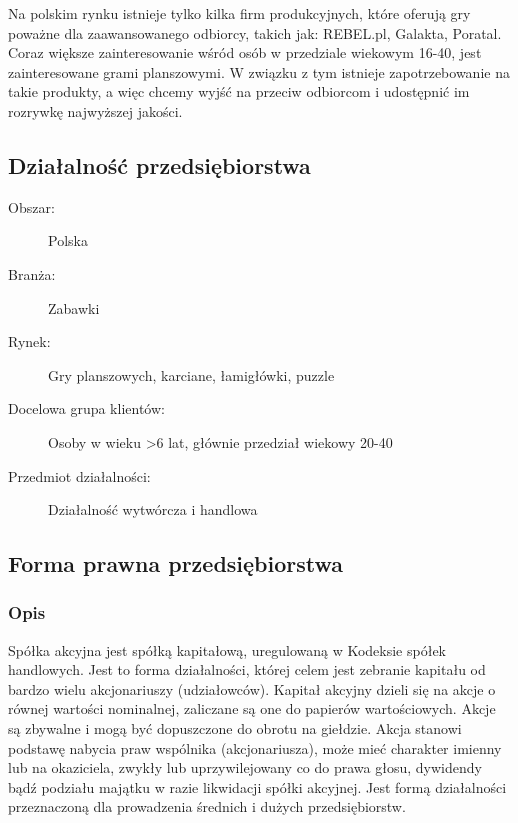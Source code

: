 \documentclass[a4paper, 11pt]{article}
\begin{document}
	Na polskim rynku istnieje tylko kilka firm produkcyjnych, które oferują gry poważne dla zaawansowanego odbiorcy, takich jak: REBEL.pl, Galakta, Poratal. Coraz większe zainteresowanie wśród osób w przedziale wiekowym 16-40, jest zainteresowane grami planszowymi. W związku z tym istnieje zapotrzebowanie na takie produkty, a więc chcemy wyjść na przeciw odbiorcom i udostępnić im rozrywkę najwyższej jakości.


	
	\subsection{Działalność przedsiębiorstwa}
	
	\begin{description}
	\item[Obszar:]	Polska
	\item[Branża:]	Zabawki
	\item[Rynek:]	Gry planszowych, karciane, łamigłówki, puzzle
	\item[Docelowa grupa klientów:]	Osoby w wieku >6 lat, głównie przedział wiekowy 20-40
	\item[Przedmiot działalności:]	Działalność wytwórcza i handlowa		
	\end{description}


	\subsection{Forma prawna przedsiębiorstwa}

	\subsubsection{Opis}
	\indent	

	Spółka akcyjna jest spółką kapitałową, uregulowaną w Kodeksie spółek handlowych. Jest to forma działalności, której celem jest zebranie kapitału od bardzo wielu akcjonariuszy (udziałowców).  Kapitał akcyjny dzieli się na akcje o równej wartości nominalnej, zaliczane są one do papierów wartościowych. Akcje są zbywalne i mogą być dopuszczone do obrotu na giełdzie. Akcja stanowi podstawę nabycia praw wspólnika (akcjonariusza), może mieć charakter imienny lub na okaziciela, zwykły lub uprzywilejowany co do prawa głosu, dywidendy bądź podziału majątku w razie likwidacji spółki akcyjnej. Jest formą działalności przeznaczoną dla prowadzenia średnich i dużych przedsiębiorstw. 
\end{document}
